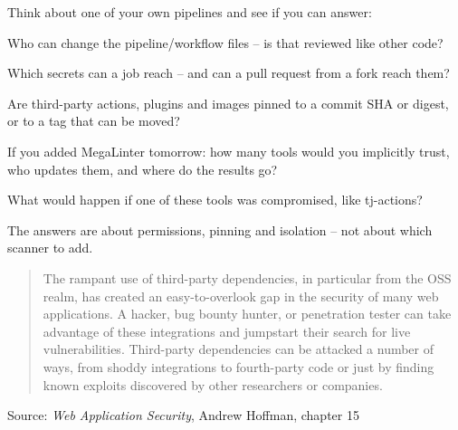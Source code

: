 \documentclass[Screen16to9,17pt]{foils}
\begin{document}
Think about one of your own pipelines and see if you can answer:
\begin{list2}
\item Who can change the pipeline/workflow files -- is that reviewed like other code?
\item Which secrets can a job reach -- and can a pull request from a fork reach them?
\item Are third-party actions, plugins and images pinned to a commit SHA or digest,\\
or to a tag that can be moved?
\item If you added MegaLinter tomorrow: how many tools would you implicitly trust,\\
who updates them, and where do the results go?
\item What would happen if one of these tools was compromised, like tj-actions?
\end{list2}

The answers are about permissions, pinning and isolation -- not about which scanner to add.

\breakdance






\begin{quote}
The rampant use of third-party dependencies, in particular from the OSS realm, has created an easy-to-overlook gap in the security of many web applications. A hacker, bug bounty hunter, or penetration tester can take advantage of these integrations and jumpstart their search for live vulnerabilities. Third-party dependencies can be attacked a number of ways, from shoddy integrations to fourth-party code or just by finding known exploits discovered by other researchers or companies.
\end{quote}
Source: \emph{Web Application Security}, Andrew Hoffman, chapter 15
\end{document}
